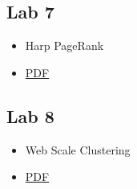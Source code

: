 \subsection{Lab 7}\label{lab-7}

\begin{itemize}

\item
  Harp PageRank
\item
  \href{https://drive.google.com/open?id=0B88HKpainTSfaDNBTzdsTk1PQ1k}{PDF}
\end{itemize}

\subsection{Lab 8}\label{lab-8}

\begin{itemize}

\item
  Web Scale Clustering
\item
  \href{https://drive.google.com/open?id=0B88HKpainTSfaVN6SUxhOGFPQUk}{PDF}
\end{itemize}
